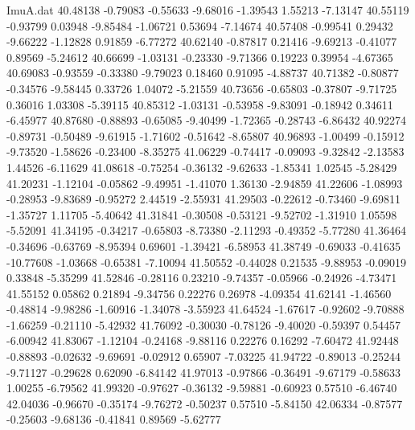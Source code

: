 \begin{filecontents}{ImuA.dat}
  40.48138   -0.79083   -0.55633   -9.68016   -1.39543    1.55213   -7.13147
  40.55119   -0.93799    0.03948   -9.85484   -1.06721    0.53694   -7.14674
  40.57408   -0.99541    0.29432   -9.66222   -1.12828    0.91859   -6.77272
  40.62140   -0.87817    0.21416   -9.69213   -0.41077    0.89569   -5.24612
  40.66699   -1.03131   -0.23330   -9.71366    0.19223    0.39954   -4.67365
  40.69083   -0.93559   -0.33380   -9.79023    0.18460    0.91095   -4.88737
  40.71382   -0.80877   -0.34576   -9.58445    0.33726    1.04072   -5.21559
  40.73656   -0.65803   -0.37807   -9.71725    0.36016    1.03308   -5.39115
  40.85312   -1.03131   -0.53958   -9.83091   -0.18942    0.34611   -6.45977
  40.87680   -0.88893   -0.65085   -9.40499   -1.72365   -0.28743   -6.86432
  40.92274   -0.89731   -0.50489   -9.61915   -1.71602   -0.51642   -8.65807
  40.96893   -1.00499   -0.15912   -9.73520   -1.58626   -0.23400   -8.35275
  41.06229   -0.74417   -0.09093   -9.32842   -2.13583    1.44526   -6.11629
  41.08618   -0.75254   -0.36132   -9.62633   -1.85341    1.02545   -5.28429
  41.20231   -1.12104   -0.05862   -9.49951   -1.41070    1.36130   -2.94859
  41.22606   -1.08993   -0.28953   -9.83689   -0.95272    2.44519   -2.55931
  41.29503   -0.22612   -0.73460   -9.69811   -1.35727    1.11705   -5.40642
  41.31841   -0.30508   -0.53121   -9.52702   -1.31910    1.05598   -5.52091
  41.34195   -0.34217   -0.65803   -8.73380   -2.11293   -0.49352   -5.77280
  41.36464   -0.34696   -0.63769   -8.95394    0.69601   -1.39421   -6.58953
  41.38749   -0.69033   -0.41635  -10.77608   -1.03668   -0.65381   -7.10094
  41.50552   -0.44028    0.21535   -9.88953   -0.09019    0.33848   -5.35299
  41.52846   -0.28116    0.23210   -9.74357   -0.05966   -0.24926   -4.73471
  41.55152    0.05862    0.21894   -9.34756    0.22276    0.26978   -4.09354
  41.62141   -1.46560   -0.48814   -9.98286   -1.60916   -1.34078   -3.55923
  41.64524   -1.67617   -0.92602   -9.70888   -1.66259   -0.21110   -5.42932
  41.76092   -0.30030   -0.78126   -9.40020   -0.59397    0.54457   -6.00942
  41.83067   -1.12104   -0.24168   -9.88116    0.22276    0.16292   -7.60472
  41.92448   -0.88893   -0.02632   -9.69691   -0.02912    0.65907   -7.03225
  41.94722   -0.89013   -0.25244   -9.71127   -0.29628    0.62090   -6.84142
  41.97013   -0.97866   -0.36491   -9.67179   -0.58633    1.00255   -6.79562
  41.99320   -0.97627   -0.36132   -9.59881   -0.60923    0.57510   -6.46740
  42.04036   -0.96670   -0.35174   -9.76272   -0.50237    0.57510   -5.84150
  42.06334   -0.87577   -0.25603   -9.68136   -0.41841    0.89569   -5.62777

\end{filecontents}
